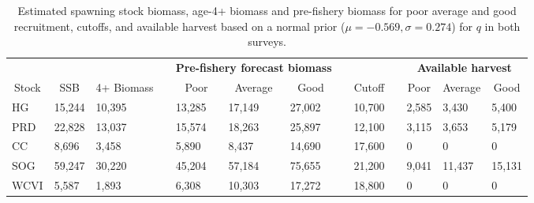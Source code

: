 %
\begin{table}[!tbp]
 \small
 \caption{Estimated spawning stock biomass,  age-4+ biomass and pre-fishery biomass for poor average and good recruitment,  cutoffs, and available harvest based on a normal prior ($\mu=-0.569,\sigma=0.274$) for $q$ in both surveys.\label{TableCatchAdvice}} 
 \begin{center}
 \begin{tabular}{lllclllclclll}\hline\hline
\multicolumn{3}{c}{\bfseries }&
\multicolumn{1}{c}{\bfseries }&
\multicolumn{3}{c}{\bfseries Pre-fishery forecast biomass}&
\multicolumn{1}{c}{\bfseries }&
\multicolumn{1}{c}{\bfseries }&
\multicolumn{1}{c}{\bfseries }&
\multicolumn{3}{c}{\bfseries Available harvest}
\tabularnewline \cline{1-13}
\multicolumn{1}{c}{Stock}&\multicolumn{1}{c}{SSB}&\multicolumn{1}{c}{4+ Biomass}&\multicolumn{1}{c}{}&\multicolumn{1}{c}{Poor}&\multicolumn{1}{c}{Average}&\multicolumn{1}{c}{Good}&\multicolumn{1}{c}{}&\multicolumn{1}{c}{Cutoff}&\multicolumn{1}{c}{}&\multicolumn{1}{c}{Poor}&\multicolumn{1}{c}{Average}&\multicolumn{1}{c}{Good}\tabularnewline
\hline
HG&15,244&10,395&&13,285&17,149&27,002&&10,700&& 2,585& 3,430& 5,400\tabularnewline
PRD&22,828&13,037&&15,574&18,263&25,897&&12,100&& 3,115& 3,653& 5,179\tabularnewline
CC& 8,696& 3,458&& 5,890& 8,437&14,690&&17,600&&     0&     0&     0\tabularnewline
SOG&59,247&30,220&&45,204&57,184&75,655&&21,200&& 9,041&11,437&15,131\tabularnewline
WCVI& 5,587& 1,893&& 6,308&10,303&17,272&&18,800&&     0&     0&     0\tabularnewline
\hline
\end{tabular}

\end{center}

\end{table}

